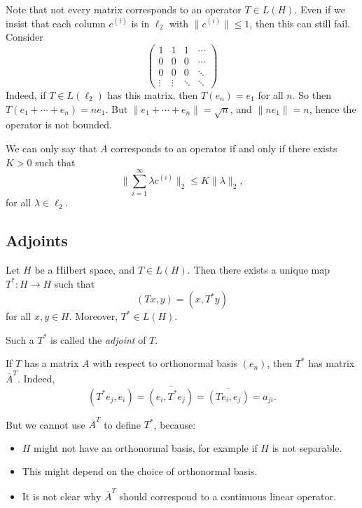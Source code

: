 \documentclass[12pt]{article}
\begin{document}
Note that not every matrix corresponds to an operator $T \in L(H)$. Even if we insist that each column $c^{(i)}$ is in $\ell_2$ with $\|c^{(i)}\| \leq 1$, then this can still fail. Consider
\[
\begin{pmatrix}
	 1 & 1 & 1 & \cdots\\
	 0 & 0 & 0 & \cdots \\
	0 & 0 & 0 &\ddots \\
	\vdots & \vdots & \ddots & \ddots
\end{pmatrix}
\]
Indeed, if $T \in L(\ell_2)$ has this matrix, then $T(e_n) = e_1$ for all $n$. So then $T(e_1 + \cdots + e_n) = n e_1$. But $\|e_1 + \cdots + e_n\| = \sqrt n$, and $\|n e_1\| = n$, hence the operator is not bounded.

We can only say that $A$ corresponds to an operator if and only if there exists $K > 0$ such that
\[
\biggl\| \sum_{i = 1}^{\infty} \lambda c^{(i)} \biggr\|_2 \leq K \|\lambda\|_2,
\]
for all $\lambda \in \ell_2$.

\subsection{Adjoints}
\label{sub:adjoint}

\begin{theorem}
	Let $H$ be a Hilbert space, and $T \in L(H)$. Then there exists a unique map $T^{\ast} : H \to H$ such that
	\[
		(Tx, y) = (x, T^{\ast} y)
	\]
	for all $x, y \in H$. Moreover, $T^{\ast} \in L(H)$.

	Such a $T^{\ast}$ is called the \emph{adjoint} of $T$.
\end{theorem}

\begin{remark}
	If $T$ has a matrix $A$ with respect to orthonormal basis $(e_n)$, then $T^{\ast}$ has matrix $\overline{A}^{T}$. Indeed,
	\[
		(T^{\ast} e_j, e_i) = \overline{(e_i, T^{\ast} e_j)} = \overline{(T e_i, e_j)} = \overline{a_{ji}}.
	\]

	But we cannot use $\overline{A}^{T}$ to define $T^{\ast}$, because:
	\begin{itemize}
		\item $H$ might not have an orthonormal basis, for example if $H$ is not separable.
		\item This might depend on the choice of orthonormal basis.
		\item It is not clear why $\overline{A}^{T}$ should correspond to a continuous linear operator.
	\end{itemize}
\end{remark}
\end{document}
